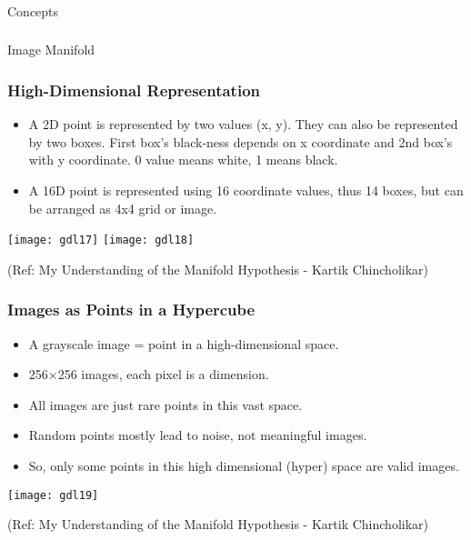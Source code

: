\begin{frame}[fragile]\frametitle{}
\begin{center}
{\Large Concepts}
\end{center}
\end{frame}

\begin{frame}[fragile]\frametitle{}
\begin{center}
{\Large Image Manifold}
\end{center}
\end{frame}

\begin{frame}[fragile]\frametitle{High-Dimensional Representation}
    \begin{itemize}
        \item A 2D point is represented by two values (x, y). They can also be represented by two boxes. First box's black-ness depends on x coordinate and 2nd box's with y coordinate. 0 value means white, 1 means black. 
        \item A 16D point is represented using 16 coordinate values, thus 14 boxes, but can be arranged as 4x4 grid or image.
    \end{itemize}
	
\begin{center}
\texttt{[image: gdl17]}
\texttt{[image: gdl18]}

{\tiny (Ref: My Understanding of the Manifold Hypothesis - Kartik Chincholikar)}	

\end{center}

\end{frame}

\begin{frame}[fragile]\frametitle{Images as Points in a Hypercube}
    \begin{itemize}
        \item A grayscale image = point in a high-dimensional space.
        \item 256×256 images, each pixel is a dimension.
        \item All images are just rare points in this vast space.
        \item Random points mostly lead to noise, not meaningful images.
		\item So, only some points in this high dimensional (hyper) space are valid images.
    \end{itemize}
	
\begin{center}
\texttt{[image: gdl19]}

{\tiny (Ref: My Understanding of the Manifold Hypothesis - Kartik Chincholikar)}	

\end{center}	
\end{frame}

